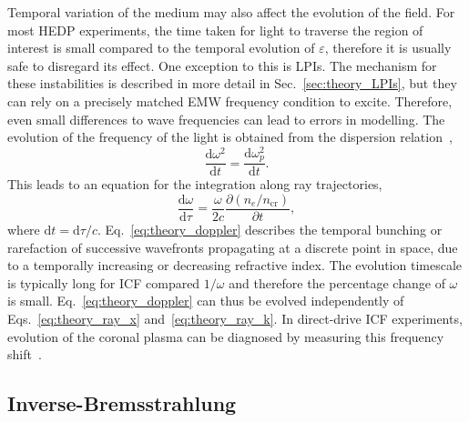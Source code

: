 Temporal variation of the medium may also affect the evolution of the field.
For most \ac{HEDP} experiments, the time taken for light to traverse the region of interest is small compared to the temporal evolution of $\varepsilon$, therefore it is usually safe to disregard its effect.
One exception to this is \ac{LPIs}.
The mechanism for these instabilities is described in more detail in Sec.~\ref{sec:theory_LPIs}, but they can rely on a precisely matched \ac{EMW} frequency condition to excite.
Therefore, even small differences to wave frequencies can lead to errors in modelling.
The evolution of the frequency of the light is obtained from the dispersion relation~\cite{dewandre_doppler_1981},
\begin{equation}
    \frac{\text{d}\omega^2}{\text{d}t} = \frac{\text{d}\omega_p^2}{\text{d}t}.
\end{equation}
This leads to an equation for the integration along ray trajectories,
\begin{equation}
    \label{eq:theory_doppler}
    \frac{\text{d} \omega}{\text{d} \tau}=\frac{\omega}{2 c} \frac{\partial\left(n_e / n_{\text{cr}}\right)}{\partial t},
\end{equation}
where $\text{d}t = \text{d}\tau/c$.
Eq.~\ref{eq:theory_doppler} describes the temporal bunching or rarefaction of successive wavefronts propagating at a discrete point in space, due to a temporally increasing or decreasing refractive index.
The evolution timescale is typically long for \ac{ICF} compared $1/\omega$ and therefore the percentage change of $\omega$ is small.
Eq.~\ref{eq:theory_doppler} can thus be evolved independently of Eqs.~\ref{eq:theory_ray_x} and~\ref{eq:theory_ray_k}.
In direct-drive \ac{ICF} experiments, evolution of the coronal plasma can be diagnosed by measuring this frequency shift~\cite{seka_timeresolved_2008}.

\subsection{Inverse-Bremsstrahlung}%
\label{sec:theory_in_brem}

